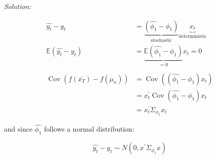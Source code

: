 \documentclass[12pt,a4paper]{article}
\newcommand{\Cov}{\operatorname{Cov}}
\begin{document}
\emph{Solution:}

\begin{align*}
  \hat{y_t} - y_t & = \underbrace{\left( \widehat{\phi_1} - \phi_1 \right)}_{\text{stochastic}} \underbrace{x_t}_{\text{deterministic}}\\
  \mathbb{E} \left( \widehat{y_t} - y_t \right) & = \underbrace{\mathbb{E} \left( \widehat{\phi_1} - \phi_1 \right) }_{= 0} x_t = 0 \\
  \\
  \Cov( f(\bar{x_T}) - f(\mu_x) ) & = \Cov \left( \left( \widehat{\phi_1} - \phi_1 \right) x_t \right) \\
  & = x_t^{'} \Cov \left( \widehat{\phi_1} - \phi_1 \right) x_t\\
  & =  x_t^{'} \Sigma_{\phi_1} x_t
\end{align*}

and since \(\widehat{\phi_1}\) follows a normal distribution:

\[\widehat{y_t} - y_t \sim N(0, x^{'} \Sigma_{\phi_1} x)\]
\end{document}
